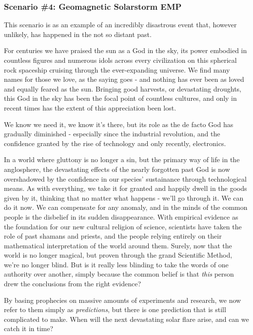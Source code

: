 \subsubsection{Scenario \#4: Geomagnetic Solarstorm EMP}
This scenario is as an example of an incredibly disastrous event that, however unlikely, has happened in the not so distant past. 

For centuries we have praised the sun as a God in the sky, its power embodied in countless figures and numerous idols across every civilization on this spherical rock spaceship cruising through the ever-expanding universe. We find many names for those we love, as the saying goes - and nothing has ever been as loved and equally feared as the sun. Bringing good harvests, or devastating droughts, this God in the sky has been the focal point of countless cultures, and only in recent times has the extent of this appreciation been lost. 

We know we need it, we know it's there, but its role as the de facto God has gradually diminished - especially since the industrial revolution, and the confidence granted by the rise of technology and only recently, electronics. 

In a world where gluttony is no longer a sin, but the primary way of life in the anglosphere, the devastating effects of the nearly forgotten past God is now overshadowed by the confidence in our species' sustainance through technological means. As with everything, we take it for granted and happily dwell in the goods given by it, thinking that no matter what happens - we'll go through it. We can do it now. We can compensate for any anomaly, and in the minds of the common people is the disbelief in its sudden disappearance. With empirical evidence as the foundation for our new cultural religion of science, scientists have taken the role of past shamans and priests, and the people relying entirely on their mathematical interpretation of the world around them. Surely, now that the world is no longer magical, but proven through the grand Scientific Method, we're no longer blind. But is it really less blinding to take the words of one authority over another, simply because the common belief is that \textit{this} person drew the conclusions from the right evidence?

By basing prophecies on massive amounts of experiments and research, we now refer to them simply as \textit{predictions}, but there is one prediction that is still complicated to make. When will the next devastating solar flare arise, and can we catch it in time? 

